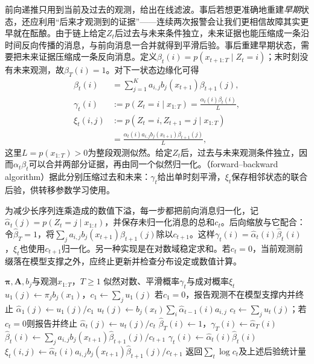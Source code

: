 前向递推只用到当前及过去的观测，给出在线滤波。事后若想更准确地重建\emph{早期}状态，还应利用“后来才观测到的证据”——连续两次报警会让我们更相信故障其实更早就在酝酿。由于链上给定$Z_t$后过去与未来条件独立，未来证据也能压缩成一条沿时间反向传播的消息，与前向消息一合并就得到平滑后验。事后重建早期状态，需要把未来证据压缩成一条反向消息。定义$\beta_t(i)=p(x_{t+1:T}\mid Z_t=i)$；末时刻没有未来观测，故$\beta_T(i)=1$。对下一状态边缘化可得
\begin{equation}
  \begin{aligned}
    \beta_t(i)&=\sum_{j=1}^{K}
      a_{i,j}b_j(x_{t+1})\beta_{t+1}(j),\\
    \gamma_t(i)&:=p(Z_t=i\mid x_{1:T})
      =\frac{\alpha_t(i)\beta_t(i)}{L},\\
    \xi_t(i,j)&:=p(Z_t=i,Z_{t+1}=j\mid x_{1:T})\\
      &=\frac{\alpha_t(i)a_{i,j}b_j(x_{t+1})
        \beta_{t+1}(j)}{L},
  \end{aligned}
  \label{eq:pgm-dynamic-backward}
\end{equation}
这里$L=p(x_{1:T})>0$为整段观测似然。给定$Z_t$后，过去与未来观测条件独立，因而$\alpha_t\beta_t$可以合并两部分证据，再由同一个似然归一化。（forward--backward algorithm）据此分别压缩过去和未来：$\gamma_t$给出单时刻平滑，$\xi_t$保存相邻状态的联合后验，供转移参数学习使用。

为减少长序列连乘造成的数值下溢，每一步都把前向消息归一化，记$\widehat\alpha_t(j)=p(Z_t=j\mid x_{1:t})$，并保存未归一化消息的总和$c_t$。后向缩放与它配合：令$\widehat\beta_T=1$，将$\sum_j a_{i,j}b_j(x_{t+1})\widehat\beta_{t+1}(j)$除以$c_{t+1}$。这样$\gamma_t(i)=\widehat\alpha_t(i)\widehat\beta_t(i)$，$\xi_t$也使用$c_{t+1}$归一化。另一种实现是在对数域稳定求和。若$c_t=0$，当前观测前缀落在模型支撑之外，应终止更新并检查分布设定或数值计算。

\begin{algorithm}
  \label{alg:pgm-dynamic-forward-backward}
  \begin{algorithmic}[1]
    \Require $\bm{\pi},\bm{A},b_j$与观测$x_{1:T}$，$T\geq1$
    \Ensure 似然对数、平滑概率$\gamma_t$与成对概率$\xi_t$
    \State $u_1(j)\gets\pi_jb_j(x_1)$，$c_1\gets\sum_j u_1(j)$
    \State 若$c_1=0$，报告观测不在模型支撑内并终止
    \State $\widehat\alpha_1(j)\gets u_1(j)/c_1$
      \State $u_t(j)\gets b_j(x_t)\sum_i\widehat\alpha_{t-1}(i)a_{i,j}$
      \State $c_t\gets\sum_j u_t(j)$；若$c_t=0$则报告并终止
      \State $\widehat\alpha_t(j)\gets u_t(j)/c_t$
    \EndFor
    \State $\widehat\beta_T(i)\gets1$，$\gamma_T(i)\gets\widehat\alpha_T(i)$
      \State $\widehat\beta_t(i)\gets
        \sum_j a_{i,j}b_j(x_{t+1})\widehat\beta_{t+1}(j)/c_{t+1}$
      \State $\gamma_t(i)\gets\widehat\alpha_t(i)\widehat\beta_t(i)$
      \State $\xi_t(i,j)\gets
        \widehat\alpha_t(i)a_{i,j}b_j(x_{t+1})
        \widehat\beta_{t+1}(j)/c_{t+1}$
    \EndFor
    \State 返回$\sum_t\log c_t$及上述后验统计量
  \end{algorithmic}
\end{algorithm}

